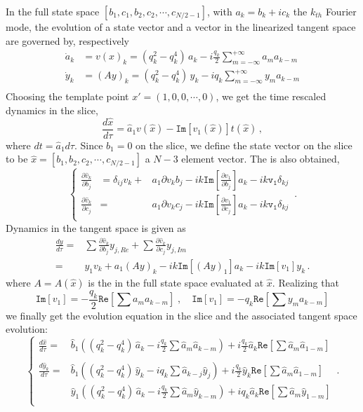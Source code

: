 In the full state space $[b_1, c_1, b_2, c_2,\cdots, c_{N/2-1}]$, with
$a_k = b_k +ic_k$ the $k_{th}$ Fourier mode, the evolution of a state
vector and a vector in the linearized tangent space are governed
by, respectively
\begin{align*}
\dot{a}_k & = v(x)_k =
     ( q_k^2 - q_k^4 )\, a_k
    - i \frac{q_k}{2} \sum_{m=-\infty}^{+\infty} a_m a_{k-m} \\
\dot{y}_k & = (Ay)_k =
      ( q_k^2 - q_k^4 )\, y_k
    - i q_k \sum_{m=-\infty}^{+\infty} y_m a_{k-m} \\
\end{align*}
Choosing the template point $x'=(1,0,0,\cdots,0)$, we get
the time rescaled dynamics
in the slice,
\[
\frac{d\hat{x}}{d\tau} = \hat{a}_1 v(\hat{x}) - \mathtt{Im}[v_1(\hat{x})] t(\hat{x})
\,,
\]
where $dt=\hat{a}_1 d\tau$. Since $b_1=0$ on the slice, we define
the state vector on the slice to be
$\hat{x}=[b_1, b_2, c_2,\cdots, c_{N/2-1}]$ a $N-3$ element vector.
The {\stabmat} is also obtained,
\[
\left\{
  \begin{aligned}
    \frac{\partial \hat{v}_k}{\partial b_j} & =
    \delta_{ij}v_k + & a_1 \partial{v_k}{b_j} - ik\mathtt{Im}[
    \frac{\partial v_1}{\partial b_j}] a_k - ik\mathtt{v_1}\delta_{kj} \\
    \frac{\partial \hat{v}_k}{\partial c_j} & =
    & a_1 \partial{v_k}{c_j} - ik\mathtt{Im}[
    \frac{\partial v_1}{\partial c_j}] a_k - ik\mathtt{v_1}\delta_{kj} \\
  \end{aligned}
\right.\,.
\]
Dynamics in the tangent space is given as
\begin{align*}
\frac{dy}{d\tau}
= & \sum \frac{\partial \hat{v}_k}{\partial b_j} y_{j,Re}
+ \sum \frac{\partial \hat{v}_k}{\partial c_j} y_{j,Im} \\
= & y_1 v_k + a_1 (Ay)_k - ik\mathtt{Im}[(Ay)_1]a_k - ik\mathtt{Im}[v_1]y_k
\,.
\end{align*}
where $A=A(\hat{x})$ is the {\stabmat} in the full state space
evaluated at $\hat{x}$. Realizing that
\[
\mathtt{Im}[v_1] =  - \frac{q_k}{2} \mathtt{Re}[\sum a_m a_{k-m}]
\;,\quad
\mathtt{Im}[v_1] = -  q_k \mathtt{Re}[\sum y_m a_{k-m}]
\]
we finally get the evolution equation in the slice and the associated
tangent space evolution:
\begin{equation}
\left\{
\begin{aligned}
  \frac{d\hat{x}}{d\tau} = & \hat{b}_1 \left(( q_k^2 - q_k^4 )\, \hat{a}_k
  - i \frac{q_k}{2} \sum \hat{a}_m \hat{a}_{k-m} \right) +
  i \frac{q_k}{2} \hat{a}_k \mathtt{Re}[\sum \hat{a}_m \hat{a}_{1-m}]\\
  \\
  \frac{d\hat{y}_k}{d\tau} = &
  \hat{b}_1 \left(( q_k^2 - q_k^4 )\, \hat{y}_k
  - i q_k \sum \hat{a}_{k-j} \hat{y}_j \right)
  + i \frac{q_k}{2} \hat{y}_k \mathtt{Re}[\sum \hat{a}_m \hat{a}_{1-m} ] \\
  &
  \hat{y}_1 \left(( q_k^2 - q_k^4 )\, \hat{a}_k
  - i \frac{q_k}{2} \sum \hat{a}_{m} \hat{y}_{k-m} \right)
  + i q_k \hat{a}_k \mathtt{Re}[\sum \hat{a}_m \hat{y}_{1-m} ] \\
\end{aligned}
\right.\,.
\label{eq:ksfjacoM1}
\end{equation}
